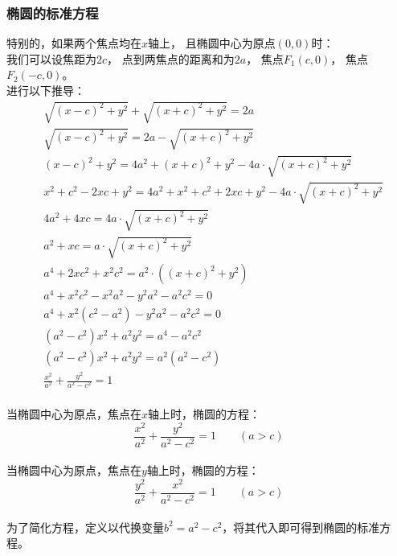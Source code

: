 \documentclass[UTF8]{ctexart}
\begin{document}
\subsubsection{椭圆的标准方程}
    特别的，如果两个焦点均在$x$轴上，
    且椭圆中心为原点$(0,0)$时：\\
    我们可以设焦距为$2c$，
    点到两焦点的距离和为$2a$，
    焦点$F_1(c,0)$，
    焦点$F_2(-c,0)$。\\[3mm]
    进行以下推导：\vspace{3pt}
    \setcounter{equation}{0}
    \begin{align}
        &\sqrt{(x-c)^2+y^2}+\sqrt{(x+c)^2+y^2}=2a\\[3.5mm]
        &\sqrt{(x-c)^2+y^2}=2a-\sqrt{(x+c)^2+y^2}\\[3.5mm]
        &(x-c)^2+y^2=4a^2+(x+c)^2+y^2-4a \cdot \sqrt{(x+c)^2+y^2}\\[3.5mm]
        &x^2+c^2-2xc+y^2=4a^2+x^2+c^2+2xc+y^2-4a \cdot \sqrt{(x+c)^2+y^2}\\[3.5mm]
        &4a^2+4xc=4a \cdot \sqrt{(x+c)^2+y^2}\\[3.5mm]
        &a^2+xc=a \cdot \sqrt{(x+c)^2+y^2}\\[3.5mm]
        &a^4+2xc^2+x^2c^2=a^2 \cdot ((x+c)^2+y^2)\\[3.5mm]
        &a^4+x^2c^2-x^2a^2-y^2a^2-a^2c^2=0\\[3.5mm]
        &a^4+x^2(c^2-a^2)-y^2a^2-a^2c^2=0\\[3.5mm]
        &(a^2-c^2)x^2+a^2y^2=a^4-a^2c^2\\[3.5mm]
        &(a^2-c^2)x^2+a^2y^2=a^2(a^2-c^2)\\[3.5mm]
        &\frac{x^2}{a^2}+\frac{y^2}{a^2-c^2}=1
    \end{align}\\
    当椭圆中心为原点，焦点在$x$轴上时，椭圆的方程：\vspace{5pt}
    \begin{equation}
        \frac{x^2}{a^2}+\frac{y^2}{a^2-c^2}=1\qquad(a>c)
    \end{equation}\\
    当椭圆中心为原点，焦点在$y$轴上时，椭圆的方程：\vspace{5pt}
    \begin{equation}
        \frac{y^2}{a^2}+\frac{x^2}{a^2-c^2}=1\qquad(a>c)
    \end{equation}\\
    为了简化方程，定义以代换变量$b^2=a^2-c^2$，将其代入即可得到椭圆的标准方程。
    
\end{document}
